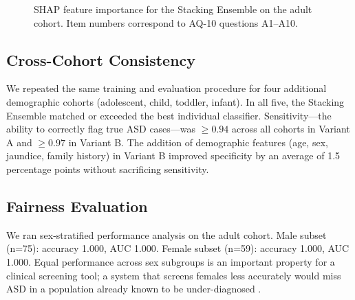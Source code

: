 \documentclass[conference]{IEEEtran}
\begin{document}
\begin{figure}[htbp]
\centering
{}
\caption{SHAP feature importance for the Stacking Ensemble on the adult
cohort. Item numbers correspond to AQ-10 questions A1--A10.}
\label{fig:shap}
\end{figure}

\subsection{Cross-Cohort Consistency}

We repeated the same training and evaluation procedure for four
additional demographic cohorts (adolescent, child, toddler, infant).
In all five, the Stacking Ensemble matched or exceeded the best
individual classifier. Sensitivity---the ability to correctly flag
true ASD cases---was $\geq 0.94$ across all cohorts in Variant A and
$\geq 0.97$ in Variant B. The addition of demographic features
(age, sex, jaundice, family history) in Variant B improved specificity
by an average of 1.5 percentage points without sacrificing sensitivity.

\subsection{Fairness Evaluation}

We ran sex-stratified performance analysis on the adult cohort.
Male subset (n=75): accuracy 1.000, AUC 1.000.
Female subset (n=59): accuracy 1.000, AUC 1.000.
Equal performance across sex subgroups is an important property for a
clinical screening tool; a system that screens females less accurately
would miss ASD in a population already known to be under-diagnosed
\cite{lai2015}.
\end{document}
